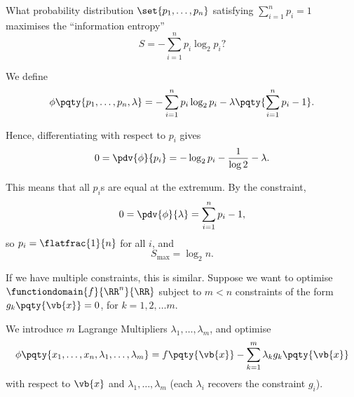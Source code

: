 \begin{example}
    What probability distribution \(\set{p_1, \ldots, p_n}\) satisfying \(\sum_{i = 1}^{n} p_i = 1\) maximises the ``information entropy''
    \[
        S = - \sum_{i = 1}^{n} p_i \log_2 p_i?
    \]

    We define
    \[
        \phi\pqty{p_1, \ldots, p_n, \lambda} = - \sum_{i = 1}^{n} p_i \log_2 p_i - \lambda \pqty{\sum_{i = 1}^{n} p_i - 1}.
    \]

    Hence, differentiating with respect to \(p_i\) gives
    \[
        0 = \pdv{\phi}{p_i} = - \log_2 p_i - \frac{1}{\log 2} - \lambda.
    \]

    This means that all \(p_i\)s are equal at the extremum. By the constraint,
    \[
        0 = \pdv{\phi}{\lambda} = \sum_{i = 1}^{n} p_i - 1,
    \]
    so \(p_i = \flatfrac{1}{n}\) for all \(i\), and
    \[
        S_{\max} = \log_2 n.
    \]
\end{example}

If we have multiple constraints, this is similar. Suppose we want to optimise \(\functiondomain{f}{\RR^n}{\RR}\) subject to \(m < n\) constraints of the form \(g_k \pqty{\vb{x}} = 0\), for \(k = 1, 2, \ldots m\).

We introduce \(m\) Lagrange Multipliers \(\lambda_1, \ldots, \lambda_m\), and optimise
\[
    \phi\pqty{x_1, \ldots, x_n, \lambda_1, \ldots, \lambda_m} = f\pqty{\vb{x}} - \sum_{k = 1}^{m} \lambda_k g_k \pqty{\vb{x}}
\]
with respect to \(\vb{x}\) and \(\lambda_1, \ldots, \lambda_m\) (each \(\lambda_i\) recovers the constraint \(g_i\)).